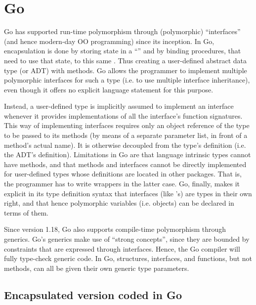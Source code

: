 \documentclass[11pt,oneside]{report}
\newcommand{\code}[1]{{\selectfont\ttfamily{#1}}}
\begin{document}
\section{Go}

Go has supported run-time polymorphism through (polymorphic)
``interfaces'' (and hence modern-day OO programming) since its
inception. In Go, encapsulation is done by storing state in a
``\code{struct}'' and by binding procedures, that need to use that
state, to this same \code{struct}. Thus creating a user-defined
abstract data type (or ADT) with methods. Go allows the programmer to
implement multiple polymorphic interfaces for such a type (i.e. to use
multiple interface inheritance), even though it offers no explicit
language statement for this purpose.

Instead, a user-defined type is implicitly assumed to implement an
interface whenever it provides implementations of all the interface's
function signatures. This way of implementing interfaces requires only
an object reference of the type to be passed to its methods (by means
of a separate parameter list, in front of a method's actual name). It
is otherwise decoupled from the type's definition (i.e. the ADT's
\code{struct} definition). Limitations in Go are that language
intrinsic types cannot have methods, and that methods and interfaces
cannot be directly implemented for user-defined types whose
definitions are located in other packages. That is, the programmer has
to write wrappers in the latter case. Go, finally, makes it explicit
in its type definition syntax that interfaces (like \code{struct}'s)
are types in their own right, and that hence polymorphic variables
(i.e. objects) can be declared in terms of them.

Since version 1.18, Go also supports compile-time polymorphism through
generics. Go's generics make use of ``strong concepts'', since they
are bounded by constraints that are expressed through
interfaces. Hence, the Go compiler will fully type-check generic code.
In Go, structures, interfaces, and functions, but not methods, can all
be given their own generic type parameters.


\subsection{Encapsulated version coded in Go}
\end{document}
